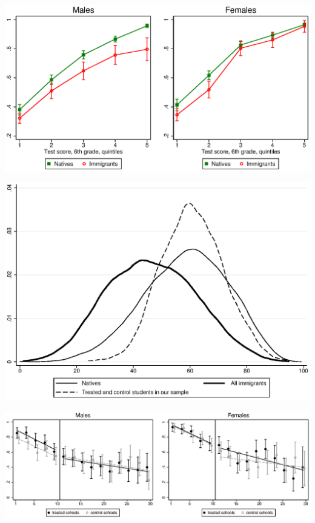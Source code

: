 \documentclass[12pt]{article}
\begin{document}
\includegraphics[scale=1]{figure_educationalchoices_f.eps}

\includegraphics[scale=1]{distinvalsi6_f.eps}

\includegraphics[scale=0.9]{rdd_top10_f.eps}
\end{document}
